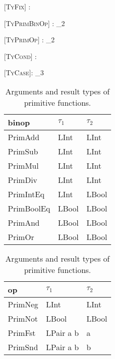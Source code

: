 \begin{prooftree*}
  [\scshape TyFix]{\Gamma \vdash {} : \tau}
\end{prooftree*}

\begin{prooftree*}
  [\scshape TyPrimBinOp]{\Gamma \vdash {} : \tau_2}
\end{prooftree*}

\begin{prooftree*}
  [\scshape TyPrimOp]{\Gamma \vdash {} : \tau_2}
\end{prooftree*}

\begin{prooftree*}
  [\scshape TyCond]{\Gamma \vdash {} : \tau}
\end{prooftree*}

\begin{prooftree*}
  [\scshape TyCase]{\Gamma \vdash {}: \tau_3}
\end{prooftree*}

\begin{table}[ht]
  \centering
  \begin{tabular}[t]{lll}
    binop      & $\tau_1$ & $\tau_2$ \\
    \midrule
    PrimAdd    & LInt     & LInt     \\
    PrimSub    & LInt     & LInt     \\
    PrimMul    & LInt     & LInt     \\
    PrimDiv    & LInt     & LInt     \\
    PrimIntEq  & LInt     & LBool    \\
    PrimBoolEq & LBool    & LBool    \\
    PrimAnd    & LBool    & LBool    \\
    PrimOr     & LBool    & LBool    \\
  \end{tabular}
  \quad
  \centering
  \begin{tabular}[t]{lll}
    op      & $\tau_1$  & $\tau_2$ \\
    \midrule
    PrimNeg & LInt      & LInt     \\
    PrimNot & LBool     & LBool    \\
    PrimFst & LPair a b & a        \\
    PrimSnd & LPair a b & b        \\
  \end{tabular}
  \caption{Arguments and result types of primitive functions.}
\end{table}
